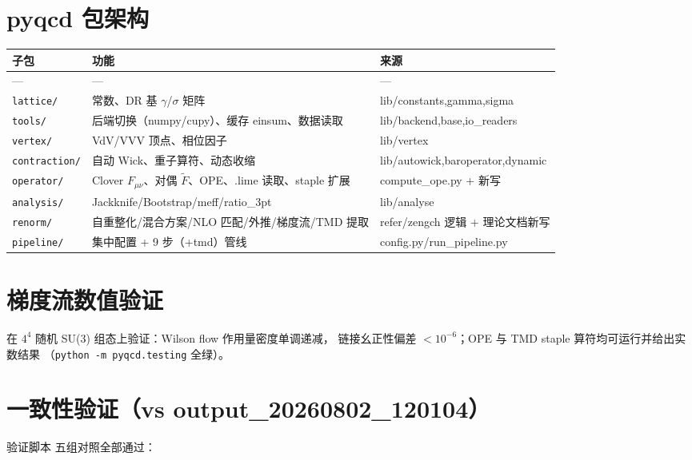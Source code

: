 \documentclass[12pt,a4paper]{ctexart}
\begin{document}
\section{pyqcd 包架构}

\begin{table}[H]
\centering
\begin{tabular}{>{\raggedright\arraybackslash}p{}>{\raggedright\arraybackslash}p{}>{\raggedright\arraybackslash}p{}}
\toprule
子包 & 功能 & 来源 \\
\midrule
--- & --- & --- \\
\texttt{lattice/} & 常数、DR 基 $\gamma$/$\sigma$ 矩阵 & lib/constants,gamma,sigma \\
\texttt{tools/} & 后端切换（numpy/cupy）、缓存 einsum、数据读取 & lib/backend,base,io\_readers \\
\texttt{vertex/} & VdV/VVV 顶点、相位因子 & lib/vertex \\
\texttt{contraction/} & 自动 Wick、重子算符、动态收缩 & lib/autowick,baroperator,dynamic \\
\texttt{operator/} & Clover $F_{\mu\nu}$、对偶 $\tilde F$、OPE、.lime 读取、staple 扩展 & compute\_ope.py + 新写 \\
\texttt{analysis/} & Jackknife/Bootstrap/meff/ratio\_3pt & lib/analyse \\
\texttt{renorm/} & 自重整化/混合方案/NLO 匹配/外推/梯度流/TMD 提取 & refer/zengch 逻辑 + 理论文档新写 \\
\texttt{pipeline/} & 集中配置 + 9 步（+tmd）管线 & config.py/run\_pipeline.py \\
\bottomrule
\end{tabular}
\end{table}
\section{梯度流数值验证}

在 $4^4$ 随机 SU(3) 组态上验证：Wilson flow 作用量密度单调递减，
链接幺正性偏差 $< 10^{-6}$；OPE 与 TMD staple 算符均可运行并给出实数结果
（\texttt{python -m pyqcd.testing} 全绿）。

\section{一致性验证（vs output\_20260802\_120104）}

验证脚本  五组对照全部通过：
\end{document}
